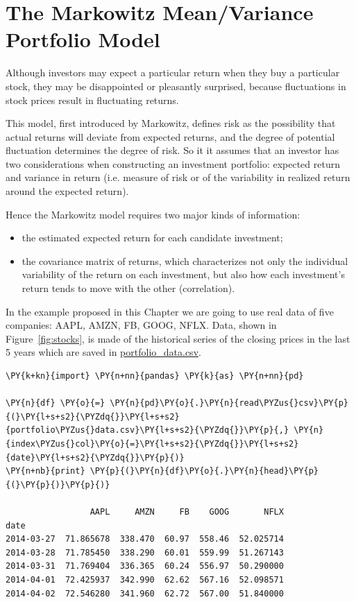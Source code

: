 \section{The Markowitz Mean/Variance Portfolio Model}
\label{the-markowitz-meanvariance-portfolio-model}

Although investors may expect a particular return when they buy a particular stock, they may be disappointed or pleasantly surprised, because fluctuations in stock prices result in fluctuating returns. 

This model, first introduced by Markowitz, defines risk as the possibility that actual returns will deviate from expected returns, and the degree of potential fluctuation determines the degree of risk.
So it it assumes that an investor has two considerations when constructing an investment portfolio: expected return and variance in return (i.e. measure of risk or of the variability in realized return around the expected return). 

Hence the Markowitz model requires two major kinds of information:

\begin{itemize}
\tightlist
\item
  the estimated expected return for each candidate investment;
\item
  the covariance matrix of returns, which characterizes not only the 
  individual variability of the return on each investment, 
  but also how each investment's return tends to move with the other (correlation).
\end{itemize}

In the example proposed in this Chapter we are going to use real data
of five companies:  AAPL, AMZN, FB, GOOG, NFLX.
Data, shown in Figure~\ref{fig:stocks}, is made of the historical 
series of the closing prices in the last 5 years which are saved in 
\href{https://drive.google.com/file/d/1srCzNlKVY_LHRpkaKoUynnmI0KImfT6Y/view?usp=sharing}{portfolio\_data.csv}.

\begin{tcolorbox}[breakable, size=fbox, boxrule=1pt, pad at break*=1mm,colback=cellbackground, colframe=cellborder]
\begin{Verbatim}[commandchars=\\\{\}]
\PY{k+kn}{import} \PY{n+nn}{pandas} \PY{k}{as} \PY{n+nn}{pd}
		
\PY{n}{df} \PY{o}{=} \PY{n}{pd}\PY{o}{.}\PY{n}{read\PYZus{}csv}\PY{p}{(}\PY{l+s+s2}{\PYZdq{}}\PY{l+s+s2}{portfolio\PYZus{}data.csv}\PY{l+s+s2}{\PYZdq{}}\PY{p}{,} \PY{n}{index\PYZus{}col}\PY{o}{=}\PY{l+s+s2}{\PYZdq{}}\PY{l+s+s2}{date}\PY{l+s+s2}{\PYZdq{}}\PY{p}{)}
\PY{n+nb}{print} \PY{p}{(}\PY{n}{df}\PY{o}{.}\PY{n}{head}\PY{p}{(}\PY{p}{)}\PY{p}{)}

                 AAPL     AMZN     FB    GOOG       NFLX
date
2014-03-27  71.865678  338.470  60.97  558.46  52.025714
2014-03-28  71.785450  338.290  60.01  559.99  51.267143
2014-03-31  71.769404  336.365  60.24  556.97  50.290000
2014-04-01  72.425937  342.990  62.62  567.16  52.098571
2014-04-02  72.546280  341.960  62.72  567.00  51.840000
\end{Verbatim}
\end{tcolorbox}

